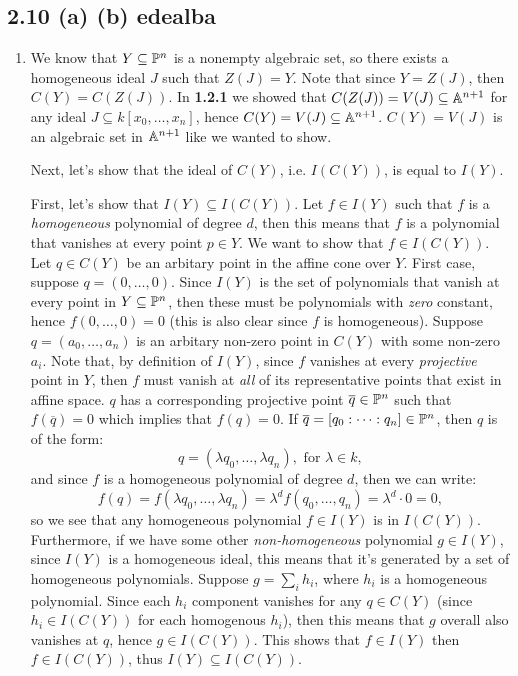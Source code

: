\subsection*{2.10 (a) (b) {edealba}}

\begin{enumerate}
    \item We know that $Y \subseteq \P^n$ is a nonempty algebraic set, so there exists a homogeneous ideal $J$ such that $Z(J) = Y$. Note that since $Y = Z(J)$, then $C(Y) = C(Z(J))$. In \textbf{1.2.1} we showed that $C(Z(J)) = V(J) \subseteq \A^{n+1}$ for any ideal $J \subseteq k[x_0, \ldots, x_n]$, hence $C(Y) = V(J) \subseteq \A^{n+1}$. $C(Y) = V(J)$ is an algebraic set in $\A^{n+1}$ like we wanted to show.

Next, let's show that the ideal of $C(Y)$, i.e. $I(C(Y))$, is equal to $I(Y)$.

First, let's show that $I(Y) \subseteq I(C(Y))$. Let $f \in I(Y)$ such that $f$ is a \emph{homogeneous} polynomial of degree $d$, then this means that $f$ is a polynomial that vanishes at every point $p \in Y$. We want to show that $f \in I(C(Y))$. Let $q \in C(Y)$ be an arbitary point in the affine cone over $Y$. First case, suppose $q = (0, \ldots, 0)$. Since $I(Y)$ is the set of polynomials that vanish at every point in $Y \subseteq \P^n$, then these must be polynomials with \emph{zero} constant, hence $f(0, \ldots, 0) = 0$ (this is also clear since $f$ is homogeneous). Suppose $q = (a_0, \ldots, a_n)$ is an arbitary non-zero point in $C(Y)$ with some non-zero $a_i$. Note that, by definition of $I(Y)$, since $f$ vanishes at every \emph{projective} point in $Y$, then $f$ must vanish at \emph{all} of its representative points that exist in affine space. $q$ has a corresponding projective point $\overline{q} \in \P^n$ such that $f(\overline{q}) = 0$ which implies that $f(q) = 0$. If $\overline{q} = [q_0: \cdots : q_n] \in \P^n$, then $q$ is of the form:
$$ q = (\lambda q_0, \ldots, \lambda q_n), \text{ for } \lambda \in k, $$
and since $f$ is a homogeneous polynomial of degree $d$, then we can write:
$$ f(q) = f(\lambda q_0, \ldots, \lambda q_n) = \lambda^d f(q_0, \ldots, q_n) = \lambda^d \cdot 0 = 0, $$
so we see that any homogeneous polynomial $f \in I(Y)$ is in $I(C(Y))$. Furthermore, if we have some other \emph{non-homogeneous} polynomial $g \in I(Y)$, since $I(Y)$ is a homogeneous ideal, this means that it's generated by a set of homogeneous polynomials. Suppose $g = \sum_i h_i$, where $h_i$ is a homogeneous polynomial. Since each $h_i$ component vanishes for any $q \in C(Y)$ (since $h_i \in I(C(Y))$ for each homogenous $h_i$), then this means that $g$ overall also vanishes at $q$, hence $g \in I(C(Y))$. This shows that $f \in I(Y)$ then $f \in I(C(Y))$, thus $I(Y) \subseteq I(C(Y))$.


\end{enumerate}
